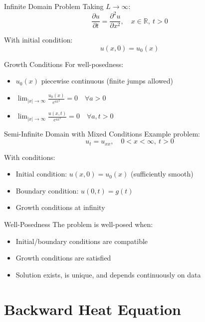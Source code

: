 \documentclass{beamer}
\begin{document}
\begin{frame}{Infinite Domain Problem}
    Taking $L \to \infty$:
    \[
    \frac{\partial u}{\partial t} = \frac{\partial^2 u}{\partial x^2}, \quad x \in \mathbb{R}, \ t > 0
    \]
    
    With initial condition:
    \[
    u(x,0) = u_0(x)
    \]
    
    \begin{block}{Growth Conditions}
        For well-posedness:
        \begin{itemize}
            \item $u_0(x)$ piecewise continuous (finite jumps allowed)
            \item $\lim_{|x|\to\infty} \frac{u_0(x)}{e^{ax^2}} = 0 \quad \forall a > 0$
            \item $\lim_{|x|\to\infty} \frac{u(x,t)}{e^{ax^2}} = 0 \quad \forall a,t > 0$
        \end{itemize}
    \end{block}
\end{frame}

\begin{frame}{Semi-Infinite Domain with Mixed Conditions}
    Example problem:
    \[
    u_t = u_{xx}, \quad 0 < x < \infty, \ t > 0
    \]
    
    With conditions:
    \begin{itemize}
        \item Initial condition: $u(x,0) = u_0(x)$ (sufficiently smooth)
        \item Boundary condition: $u(0,t) = g(t)$
        \item Growth conditions at infinity
    \end{itemize}
    
    \begin{alertblock}{Well-Posedness}
        The problem is well-posed when:
        \begin{itemize}
            \item Initial/boundary conditions are compatible
            \item Growth conditions are satisfied
            \item Solution exists, is unique, and depends continuously on data
        \end{itemize}
    \end{alertblock}
\end{frame}

\section{Backward Heat Equation}
\end{document}
